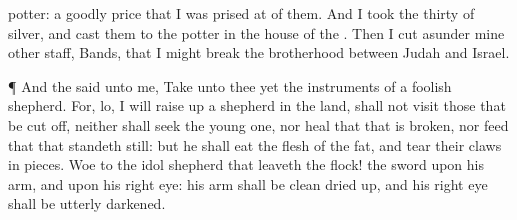 {potter: a
goodly
price that I was prised
at of them. And I
took the
thirty
{} of
silver, and
cast them to the
potter in the
house of the
{}.
Then I cut
asunder mine
other
staff,
{}
Bands, that I might
break the
brotherhood between
Judah and
Israel.
\par }{\PP {}¶ And the
{}
said unto me,
Take unto thee yet the
instruments of a
foolish
shepherd.
For, lo, I will raise
up a
shepherd in the
land,
{} shall not
visit those that be cut
off, neither shall
seek the young
one, nor
heal that that is
broken, nor
feed that that
standeth still: but he shall
eat the
flesh of the
fat, and
tear their
claws in
pieces.
Woe to the
idol
shepherd that
leaveth the
flock! the
sword
{} upon his
arm, and upon his
right
eye: his
arm shall be
clean dried
up, and his
right
eye shall be
utterly
darkened.

}
